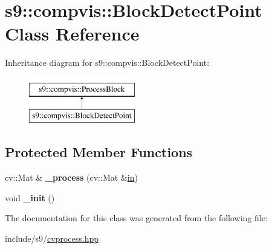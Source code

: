 \hypertarget{classs9_1_1compvis_1_1BlockDetectPoint}{\section{s9\-:\-:compvis\-:\-:\-Block\-Detect\-Point \-Class \-Reference}
\label{classs9_1_1compvis_1_1BlockDetectPoint}
}
\-Inheritance diagram for s9\-:\-:compvis\-:\-:\-Block\-Detect\-Point\-:\begin{figure}[H]
\begin{center}
\leavevmode
\includegraphics[height=2.000000cm]{classs9_1_1compvis_1_1BlockDetectPoint}
\end{center}
\end{figure}
\subsection*{\-Protected \-Member \-Functions}
\begin{DoxyCompactItemize}
\item 
\hypertarget{classs9_1_1compvis_1_1BlockDetectPoint_ab7006a8233569879bf998aa4e0d0c540}{cv\-::\-Mat \& {\bfseries \-\_\-process} (cv\-::\-Mat \&\hyperlink{structin}{in})}\label{classs9_1_1compvis_1_1BlockDetectPoint_ab7006a8233569879bf998aa4e0d0c540}

\item 
\hypertarget{classs9_1_1compvis_1_1BlockDetectPoint_a5194bc6948d4efe3679a236e7a651a60}{void {\bfseries \-\_\-init} ()}\label{classs9_1_1compvis_1_1BlockDetectPoint_a5194bc6948d4efe3679a236e7a651a60}

\end{DoxyCompactItemize}


\-The documentation for this class was generated from the following file\-:\begin{DoxyCompactItemize}
\item 
include/s9/\hyperlink{cvprocess_8hpp}{cvprocess.\-hpp}\end{DoxyCompactItemize}
